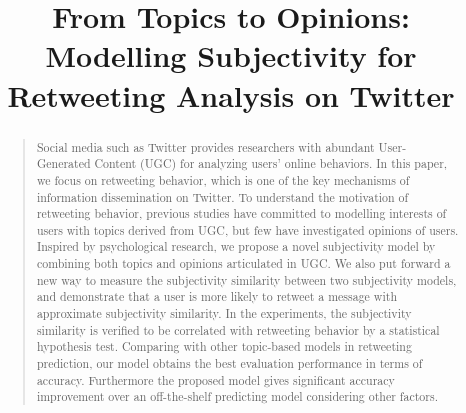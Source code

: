 \documentclass[letterpaper]{article}
\begin{document}
%
\title{From Topics to Opinions: \\Modelling Subjectivity for Retweeting Analysis on Twitter}
\nocopyright
\maketitle
\begin{abstract}
\begin{quote}
Social media such as Twitter provides researchers with abundant User-Generated Content (UGC) for analyzing users' online behaviors. In this paper, we focus on retweeting behavior, which is one of the key mechanisms of information dissemination on Twitter. 
To understand the motivation of retweeting behavior, previous studies have committed to modelling interests of users with topics derived from UGC, but few have investigated opinions of users. 
Inspired by psychological research, we propose a novel subjectivity model by combining both topics and opinions articulated in UGC. 
We also put forward a new way to measure the subjectivity similarity between two subjectivity models, and demonstrate that a user is more likely to retweet a message with approximate subjectivity similarity.  
In the experiments, the subjectivity similarity is verified to be correlated with retweeting behavior by a statistical hypothesis test. 
Comparing with other topic-based models in retweeting prediction, our model obtains the best evaluation performance in terms of accuracy. 
Furthermore the proposed model gives significant accuracy improvement over an off-the-shelf predicting model considering other factors.
\end{quote}
\end{abstract}
\end{document}
